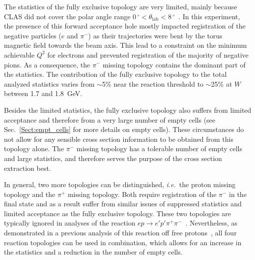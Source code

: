 \documentclass[prc,twocolumn,superscriptaddress,showpacs,amssymb,amsmath,amsfonts,aps,nofootinbib]{revtex4-1}
\begin{document}
The statistics of the fully exclusive topology are very limited, mainly because CLAS did not cover the polar angle range $0\,^{\circ}\mathrm{} < \theta_{\textrm{lab}} < 8\,^{\circ}\mathrm{}$~\cite{Mecking:2003zu}. In this experiment, the presence of this forward acceptance hole mostly impacted registration of the negative particles ($e$ and $\pi^{-}$) as their trajectories were bent by the torus magnetic field towards the beam axis. This lead to a constraint on the minimum achievable $Q^2$ for electrons and prevented registration of the majority of negative pions. As a consequence, the $\pi^{-}$ missing topology contains the dominant part of the statistics. The contribution of the fully exclusive topology to the total analyzed statistics varies from $\sim$5\% near the reaction threshold to $\sim$25\% at $W$ between 1.7 and 1.8~GeV. 


 
Besides the limited statistics, the fully exclusive topology also suffers from limited acceptance and therefore from a very large number of empty cells (see Sec.\!~\ref{Sect:empt_cells} for more details on empty cells). These circumstances do not allow for any sensible cross section information to be obtained from this topology alone. The $\pi^{-}$ missing topology has a tolerable number of empty cells and large statistics, and therefore serves the purpose of the cross section extraction best. %



In general, two more topologies can be distinguished, {\it i.e.}~the proton missing topology and the $\pi^{+}$ missing topology. Both require registration of the $\pi^{-}$ in the final state and as a result suffer from similar issues of suppressed statistics and limited acceptance as the fully exclusive topology.  These two topologies are typically ignored in analyses of the reaction $ep\rightarrow{}e'p'\pi^{+}\pi^{-}$~\cite{Rip_an_note:2002,Ripani:2002ss,Fed_an_note:2007,Fedotov:2008aa,Isupov:2017lnd}. Nevertheless, as demonstrated in a previous analysis of this reaction off free protons~\cite{Fed_an_note:2017,Fed_paper_2018}, all four reaction topologies can be used in combination, which allows for an increase in the statistics and a reduction in the number of empty cells.

\end{document}
